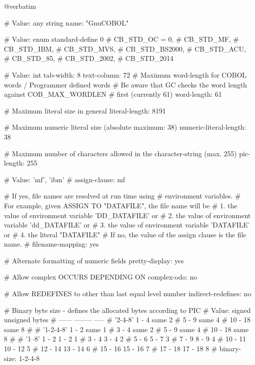 @verbatim


# Value: any string
name: "GnuCOBOL"

# Value: enum
standard-define			0
#        CB_STD_OC = 0,
#        CB_STD_MF,
#        CB_STD_IBM,
#        CB_STD_MVS,
#        CB_STD_BS2000,
#        CB_STD_ACU,
#        CB_STD_85,
#        CB_STD_2002,
#        CB_STD_2014

# Value: int
tab-width:			8
text-column:			72
# Maximum word-length for COBOL words / Programmer defined words
# Be aware that GC checks the word length against COB_MAX_WORDLEN
# first (currently 61)
word-length:			61

# Maximum literal size in general
literal-length:			8191

# Maximum numeric literal size (absolute maximum: 38)
numeric-literal-length:	38

# Maximum number of characters allowed in the character-string (max. 255)
pic-length:				255

# Value: 'mf', 'ibm'
#
assign-clause:			mf

# If yes, file names are resolved at run time using
# environment variables.
# For example, given ASSIGN TO "DATAFILE", the file name will be
#  1. the value of environment variable 'DD_DATAFILE' or
#  2. the value of environment variable 'dd_DATAFILE' or
#  3. the value of environment variable 'DATAFILE' or
#  4. the literal "DATAFILE"
# If no, the value of the assign clause is the file name.
#
filename-mapping:		yes

# Alternate formatting of numeric fields
pretty-display:			yes

# Allow complex OCCURS DEPENDING ON
complex-odo:			no

# Allow REDEFINES to other than last equal level number
indirect-redefines:		no

# Binary byte size - defines the allocated bytes according to PIC
# Value:         signed  unsigned  bytes
#                ------  --------  -----
# '2-4-8'        1 -  4    same        2
#                5 -  9    same        4
#               10 - 18    same        8
#
# '1-2-4-8'      1 -  2    same        1
#                3 -  4    same        2
#                5 -  9    same        4
#               10 - 18    same        8
#
# '1--8'         1 -  2    1 -  2      1
#                3 -  4    3 -  4      2
#                5 -  6    5 -  7      3
#                7 -  9    8 -  9      4
#               10 - 11   10 - 12      5
#               12 - 14   13 - 14      6
#               15 - 16   15 - 16      7
#               17 - 18   17 - 18      8
#
binary-size:			1-2-4-8


